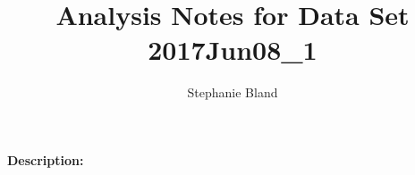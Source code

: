 \documentclass{article}
\title{Analysis Notes for Data Set 2017Jun08\_1}
\author{Stephanie Bland}
\begin{document}
\maketitle
{\bf Description:}
\end{document}
